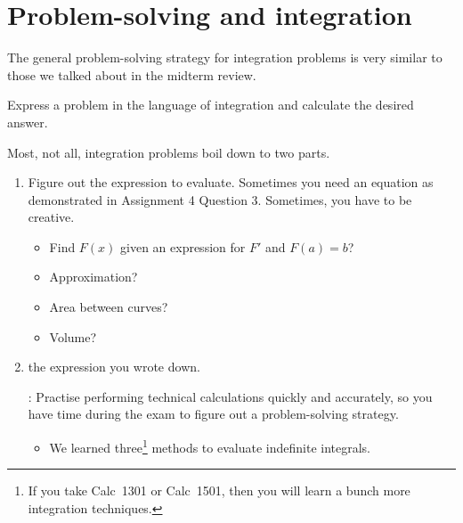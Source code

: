 \documentclass[../main.tex]{subfiles}
\begin{document}
 \section{Problem-solving and integration}
  The general problem-solving strategy for integration problems is very similar to those we talked about in the midterm review.

  \begin{mdframed}[style=simple]
    Express a problem in the language of integration and calculate the desired answer. 
  \end{mdframed}

  Most, not all, integration problems boil down to two parts.
  \begin{enumerate}[wide, label=\textbf{Part~\arabic*}.]
    \item Figure out the  expression to evaluate. Sometimes you need an equation as demonstrated in Assignment 4 Question 3. Sometimes, you have to be creative.

      \begin{itemize}[wide]
        \item Find \(F(x)\) given an expression for \(F'\) and \(F(a) = b\)?

        \item Approximation?  

        \item Area between curves?  

        \item Volume?  

      \end{itemize}

    \item {} the expression you wrote down. 

      : Practise performing technical calculations quickly and accurately, so you have time during the exam to figure out a problem-solving strategy.

      \begin{itemize}
        \item We learned three\footnote{If you take Calc~1301 or Calc~1501, then you will learn a bunch more integration techniques.} methods to evaluate indefinite integrals.


\end{itemize}
\end{enumerate}
\end{document}
